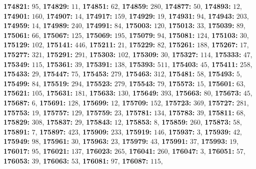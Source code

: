 \textsf{\bfseries 174821:} $95$, \textsf{\bfseries 174829:} $11$, \textsf{\bfseries 174851:} $62$, \textsf{\bfseries 174859:} $280$, \textsf{\bfseries 174877:} $50$, \textsf{\bfseries 174893:} $12$, \textsf{\bfseries 174901:} $160$, \textsf{\bfseries 174907:} $14$, \textsf{\bfseries 174917:} $159$, \textsf{\bfseries 174929:} $19$, \textsf{\bfseries 174931:} $94$, \textsf{\bfseries 174943:} $203$, \textsf{\bfseries 174959:} $14$, \textsf{\bfseries 174989:} $240$, \textsf{\bfseries 174991:} $84$, \textsf{\bfseries 175003:} $120$, \textsf{\bfseries 175013:} $33$, \textsf{\bfseries 175039:} $89$, \textsf{\bfseries 175061:} $66$, \textsf{\bfseries 175067:} $125$, \textsf{\bfseries 175069:} $195$, \textsf{\bfseries 175079:} $94$, \textsf{\bfseries 175081:} $124$, \textsf{\bfseries 175103:} $30$, \textsf{\bfseries 175129:} $102$, \textsf{\bfseries 175141:} $446$, \textsf{\bfseries 175211:} $21$, \textsf{\bfseries 175229:} $82$, \textsf{\bfseries 175261:} $188$, \textsf{\bfseries 175267:} $17$, \textsf{\bfseries 175277:} $321$, \textsf{\bfseries 175291:} $291$, \textsf{\bfseries 175303:} $102$, \textsf{\bfseries 175309:} $30$, \textsf{\bfseries 175327:} $114$, \textsf{\bfseries 175333:} $47$, \textsf{\bfseries 175349:} $115$, \textsf{\bfseries 175361:} $39$, \textsf{\bfseries 175391:} $138$, \textsf{\bfseries 175393:} $511$, \textsf{\bfseries 175403:} $45$, \textsf{\bfseries 175411:} $258$, \textsf{\bfseries 175433:} $29$, \textsf{\bfseries 175447:} $75$, \textsf{\bfseries 175453:} $279$, \textsf{\bfseries 175463:} $312$, \textsf{\bfseries 175481:} $58$, \textsf{\bfseries 175493:} $5$, \textsf{\bfseries 175499:} $84$, \textsf{\bfseries 175519:} $294$, \textsf{\bfseries 175523:} $279$, \textsf{\bfseries 175543:} $79$, \textsf{\bfseries 175573:} $15$, \textsf{\bfseries 175601:} $63$, \textsf{\bfseries 175621:} $105$, \textsf{\bfseries 175631:} $181$, \textsf{\bfseries 175633:} $130$, \textsf{\bfseries 175649:} $393$, \textsf{\bfseries 175663:} $80$, \textsf{\bfseries 175673:} $45$, \textsf{\bfseries 175687:} $6$, \textsf{\bfseries 175691:} $128$, \textsf{\bfseries 175699:} $12$, \textsf{\bfseries 175709:} $152$, \textsf{\bfseries 175723:} $369$, \textsf{\bfseries 175727:} $281$, \textsf{\bfseries 175753:} $19$, \textsf{\bfseries 175757:} $129$, \textsf{\bfseries 175759:} $23$, \textsf{\bfseries 175781:} $134$, \textsf{\bfseries 175783:} $39$, \textsf{\bfseries 175811:} $68$, \textsf{\bfseries 175829:} $308$, \textsf{\bfseries 175837:} $29$, \textsf{\bfseries 175843:} $12$, \textsf{\bfseries 175853:} $8$, \textsf{\bfseries 175859:} $260$, \textsf{\bfseries 175873:} $58$, \textsf{\bfseries 175891:} $7$, \textsf{\bfseries 175897:} $423$, \textsf{\bfseries 175909:} $233$, \textsf{\bfseries 175919:} $146$, \textsf{\bfseries 175937:} $3$, \textsf{\bfseries 175939:} $42$, \textsf{\bfseries 175949:} $98$, \textsf{\bfseries 175961:} $30$, \textsf{\bfseries 175963:} $23$, \textsf{\bfseries 175979:} $43$, \textsf{\bfseries 175991:} $37$, \textsf{\bfseries 175993:} $19$, \textsf{\bfseries 176017:} $95$, \textsf{\bfseries 176021:} $137$, \textsf{\bfseries 176023:} $265$, \textsf{\bfseries 176041:} $260$, \textsf{\bfseries 176047:} $3$, \textsf{\bfseries 176051:} $57$, \textsf{\bfseries 176053:} $39$, \textsf{\bfseries 176063:} $53$, \textsf{\bfseries 176081:} $97$, \textsf{\bfseries 176087:} $115$, 
